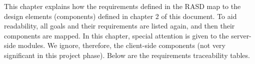 This chapter explains how the requirements defined in the RASD map to the design elements (components) defined in chapter 2 of this document. To aid readability, all goals and their requirements are listed again, and then their components are mapped. In this chapter, special attention is given to the server-side modules. We ignore, therefore, the client-side components (not very significant in this project phase). Below are the requirements traceability tables.